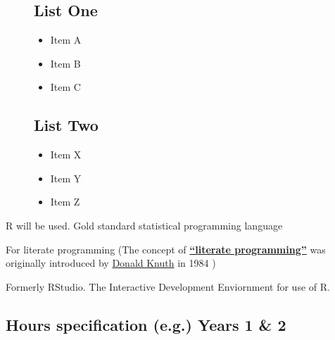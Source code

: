 \documentclass[
  11pt,
  letterpaper,
  oneside,
  open=any]{scrbook}
\providecommand{\tightlist}{%
  \setlength{\itemsep}{0pt}\setlength{\parskip}{0pt}}\usepackage{longtable,booktabs,array}
\begin{document}
\begin{figure}

\begin{minipage}[t]{0.50\linewidth}

{\centering 

\hypertarget{list-one}{%
\subsection{List One}\label{list-one}}

\begin{itemize}
\tightlist
\item
  Item A
\item
  Item B
\item
  Item C
\end{itemize}

}

\end{minipage}%
%
\begin{minipage}[t]{0.50\linewidth}

{\centering 

\hypertarget{list-two}{%
\subsection{List Two}\label{list-two}}

\begin{itemize}
\tightlist
\item
  Item X
\item
  Item Y
\item
  Item Z
\end{itemize}

}

\end{minipage}%

\end{figure}

R will be used. Gold standard statistical programming language

For literate programming (The concept of
\href{https://en.wikipedia.org/wiki/Literate_programming}{\textbf{``literate
programming''}} was originally introduced by
\href{http://www.literateprogramming.com/knuthweb.pdf}{Donald Knuth} in
1984 )

Formerly RStudio. The Interactive Development Enviornment for use of R.

\hypertarget{hours-specification-e.g.-years-1-2}{%
\subsection{Hours specification (e.g.) Years 1 \&
2}\label{hours-specification-e.g.-years-1-2}}
\end{document}
